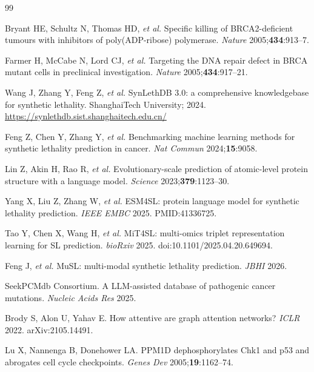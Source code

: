 \documentclass[12pt,a4paper]{article}
\begin{document}
\begin{thebibliography}{99}

Bryant HE, Schultz N, Thomas HD, \textit{et al.}
Specific killing of BRCA2-deficient tumours with inhibitors of poly(ADP-ribose) polymerase.
\textit{Nature} 2005;\textbf{434}:913--7.

Farmer H, McCabe N, Lord CJ, \textit{et al.}
Targeting the DNA repair defect in BRCA mutant cells in preclinical investigation.
\textit{Nature} 2005;\textbf{434}:917--21.

Wang J, Zhang Y, Feng Z, \textit{et al.}
SynLethDB 3.0: a comprehensive knowledgebase for synthetic lethality.
ShanghaiTech University; 2024. \url{https://synlethdb.sist.shanghaitech.edu.cn/}

Feng Z, Chen Y, Zhang Y, \textit{et al.}
Benchmarking machine learning methods for synthetic lethality prediction in cancer.
\textit{Nat Commun} 2024;\textbf{15}:9058.

Lin Z, Akin H, Rao R, \textit{et al.}
Evolutionary-scale prediction of atomic-level protein structure with a language model.
\textit{Science} 2023;\textbf{379}:1123--30.

Yang X, Liu Z, Zhang W, \textit{et al.}
ESM4SL: protein language model for synthetic lethality prediction.
\textit{IEEE EMBC} 2025. PMID:41336725.

Tao Y, Chen X, Wang H, \textit{et al.}
MiT4SL: multi-omics triplet representation learning for SL prediction.
\textit{bioRxiv} 2025. doi:10.1101/2025.04.20.649694.

Feng J, \textit{et al.}
MuSL: multi-modal synthetic lethality prediction.
\textit{JBHI} 2026.

SeekPCMdb Consortium.
A LLM-assisted database of pathogenic cancer mutations.
\textit{Nucleic Acids Res} 2025.

Brody S, Alon U, Yahav E.
How attentive are graph attention networks?
\textit{ICLR} 2022. arXiv:2105.14491.

Lu X, Nannenga B, Donehower LA.
PPM1D dephosphorylates Chk1 and p53 and abrogates cell cycle checkpoints.
\textit{Genes Dev} 2005;\textbf{19}:1162--74.


\end{thebibliography}
\end{document}
